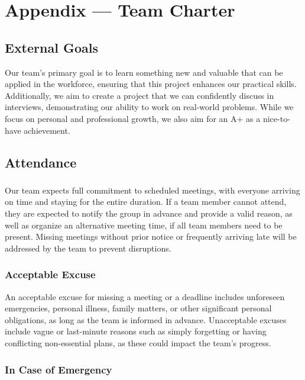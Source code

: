 \documentclass{article}
\begin{document}
\newpage{}

\section*{Appendix --- Team Charter}

\subsection*{External Goals}

Our team's primary goal is to learn something new and valuable that
can be applied in the workforce,
ensuring that this project enhances our practical skills.
Additionally, we aim to create a project
that we can confidently discuss in interviews, demonstrating our
ability to work on real-world
problems. While we focus on personal and professional growth, we also
aim for an A+ as a
nice-to-have achievement.

\subsection*{Attendance}

\subsubsection*{\color{blue}{Expectations}}

Our team expects full commitment to scheduled meetings, with everyone
arriving on time and staying
for the entire duration. If a team member cannot attend, they are
expected to notify the group in
advance and provide a valid reason, as well as organize an
alternative meeting time, if all team
members need to be present. Missing meetings without prior notice or
frequently arriving late
will be addressed by the team to prevent disruptions.

\subsubsection*{\color{blue}Acceptable Excuse}

An acceptable excuse for missing a meeting or a deadline includes
unforeseen emergencies, personal
illness, family matters, or other significant personal obligations,
as long as the team is
informed in advance. Unacceptable excuses include vague or
last-minute reasons such as simply
forgetting or having conflicting non-essential plans, as these could
impact the team's progress.

\subsubsection*{\color{blue}In Case of Emergency}
\end{document}
